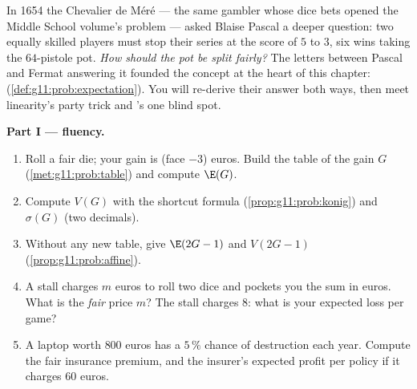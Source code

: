 \begin{problem}
\label{pb:g11:prob:1}
In 1654 the Chevalier de M\'er\'e --- the same gambler whose dice
bets opened the Middle School volume's  problem ---
asked Blaise Pascal a deeper question: two equally skilled
players must stop their series at the score of $5$ to $3$, six
wins taking the $64$-pistole pot. \emph{How should the pot be
split fairly?} The letters between Pascal and Fermat answering it
founded the concept at the heart of this chapter: 
(\cref{def:g11:prob:expectation}). You will re-derive their
answer both ways, then meet linearity's party trick and
's one blind spot.

\medskip
\noindent\textbf{Part I ---  fluency.}
\begin{enumerate}
  \item Roll a fair die; your gain is (face $- 3$) euros. Build
        the  table of the gain $G$
        (\cref{met:g11:prob:table}) and compute $\E(G)$.
  \item Compute $V(G)$ with the shortcut formula
        (\cref{prop:g11:prob:konig}) and $\sigma(G)$ (two
        decimals).
  \item Without any new table, give $\E(2G - 1)$ and
        $V(2G - 1)$ (\cref{prop:g11:prob:affine}).
  \item A stall charges $m$ euros to roll two dice and pockets
        you the sum in euros. What is the \emph{fair} price
        $m$? The stall charges $8$: what is your expected loss
        per game?
  \item A laptop worth $800$ euros has a $5\,\%$ chance of
        destruction each year. Compute the fair insurance
        premium, and the insurer's expected profit per policy
        if it charges $60$ euros.
\end{enumerate}


\end{problem}
